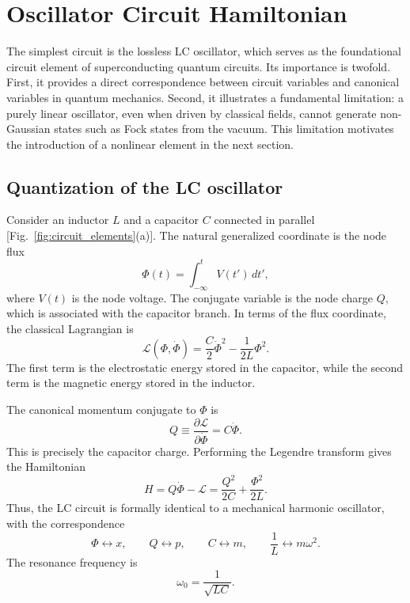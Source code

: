\section{Oscillator Circuit Hamiltonian}
\label{sec:oscillator_hamiltonian}

The simplest circuit is the lossless LC oscillator, which serves as the foundational circuit element of superconducting quantum circuits. Its importance is twofold. First, it provides a direct correspondence between circuit variables and canonical variables in quantum mechanics. Second, it illustrates a fundamental limitation: a purely linear oscillator, even when driven by classical fields, cannot generate non-Gaussian states such as Fock states from the vacuum. This limitation motivates the introduction of a nonlinear element in the next section.

\subsection{Quantization of the LC oscillator}

Consider an inductor $L$ and a capacitor $C$ connected in parallel [Fig.~\ref{fig:circuit_elements}(a)]. The natural generalized coordinate is the node flux
\begin{equation}
    \Phi(t) = \int_{-\infty}^{t} V(t')\,dt',
\end{equation}
where $V(t)$ is the node voltage. The conjugate variable is the node charge $Q$, which is associated with the capacitor branch. In terms of the flux coordinate, the classical Lagrangian is
\begin{equation}
    \mathcal{L}(\Phi,\dot{\Phi}) = \frac{C}{2}\dot{\Phi}^{2} - \frac{1}{2L}\Phi^{2}.
\end{equation}
The first term is the electrostatic energy stored in the capacitor, while the second term is the magnetic energy stored in the inductor.

The canonical momentum conjugate to $\Phi$ is
\begin{equation}
    Q \equiv \frac{\partial \mathcal{L}}{\partial \dot{\Phi}} = C\dot{\Phi}.
\end{equation}
This is precisely the capacitor charge. Performing the Legendre transform gives the Hamiltonian
\begin{equation}
    H = Q\dot{\Phi} - \mathcal{L}
      = \frac{Q^{2}}{2C} + \frac{\Phi^{2}}{2L}.
\end{equation}
Thus, the LC circuit is formally identical to a mechanical harmonic oscillator, with the correspondence
\begin{equation}
    \Phi \leftrightarrow x,
    \qquad
    Q \leftrightarrow p,
    \qquad
    C \leftrightarrow m,
    \qquad
    \frac{1}{L} \leftrightarrow m\omega^{2}.
\end{equation}
The resonance frequency is
\begin{equation}
    \omega_{0} = \frac{1}{\sqrt{LC}}.
\end{equation}


